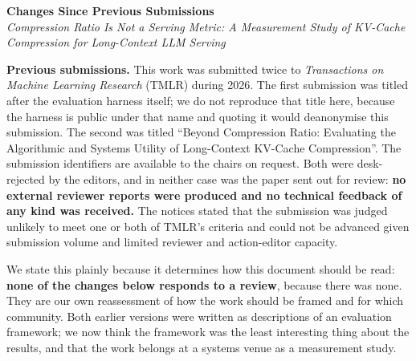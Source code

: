 \documentclass[10pt]{article}
\begin{document}
\begin{center}
{\large\textbf{Changes Since Previous Submissions}}\\[0.3em]
\emph{Compression Ratio Is Not a Serving Metric: A Measurement Study of
KV-Cache Compression for Long-Context LLM Serving}
\end{center}
\vspace{0.3em}

\noindent\textbf{Previous submissions.}
This work was submitted twice to \emph{Transactions on Machine Learning
Research} (TMLR) during 2026. The first submission was titled after the
evaluation harness itself; we do not reproduce that title here, because the
harness is public under that name and quoting it would deanonymise this
submission. The second was titled ``Beyond Compression Ratio: Evaluating the
Algorithmic and Systems Utility of Long-Context KV-Cache Compression''.
The submission identifiers are available to the chairs on request.
Both were desk-rejected by the editors, and in neither case was the paper sent
out for review: \textbf{no external reviewer reports were produced and no
technical feedback of any kind was received.} The notices stated that the
submission was judged unlikely to meet one or both of TMLR's criteria and could
not be advanced given submission volume and limited reviewer and action-editor
capacity.

\smallskip
\noindent We state this plainly because it determines how this document should
be read: \textbf{none of the changes below responds to a review}, because there
was none. They are our own reassessment of how the work should be framed and
for which community. Both earlier versions were written as descriptions of an
evaluation framework; we now think the framework was the least interesting
thing about the results, and that the work belongs at a systems venue as a
measurement study.
\end{document}
